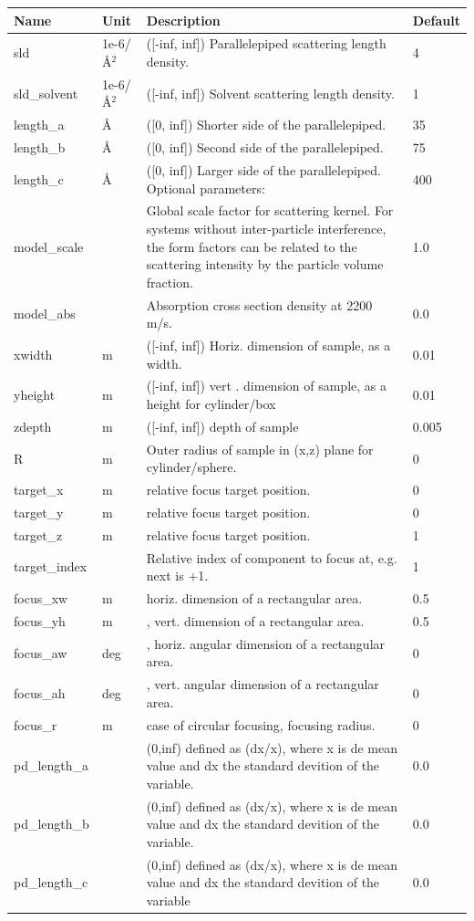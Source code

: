\begin{longtable}{p{}p{}p{}p{}}
\toprule
\textbf{Name} & \textbf{Unit} & \textbf{Description} & \textbf{Default} \\
\midrule
\endhead
sld & 1e-6/\AA{}$^{2}$ & ([-inf, inf]) Parallelepiped scattering length density. & 4 \\
sld\_solvent & 1e-6/\AA{}$^{2}$ & ([-inf, inf]) Solvent scattering length density. & 1 \\
length\_a & \AA{} & ([0, inf]) Shorter side of the parallelepiped. & 35 \\
length\_b & \AA{} & ([0, inf]) Second side of the parallelepiped. & 75 \\
length\_c & \AA{} & ([0, inf]) Larger side of the parallelepiped. Optional parameters: & 400 \\
model\_scale &   & Global scale factor for scattering kernel. For systems without inter-particle interference, the form factors can be related to the scattering intensity by the particle volume fraction. & 1.0 \\
model\_abs &   & Absorption cross section density at 2200 m/s. & 0.0 \\
xwidth & m & ([-inf, inf]) Horiz. dimension of sample, as a width. & 0.01 \\
yheight & m & ([-inf, inf]) vert . dimension of sample, as a height for cylinder/box & 0.01 \\
zdepth & m & ([-inf, inf]) depth of sample & 0.005 \\
R & m & Outer radius of sample in (x,z) plane for cylinder/sphere. & 0 \\
target\_x & m & relative focus target position. & 0 \\
target\_y & m & relative focus target position. & 0 \\
target\_z & m & relative focus target position. & 1 \\
target\_index &   & Relative index of component to focus at, e.g. next is +1. & 1 \\
focus\_xw & m & horiz. dimension of a rectangular area. & 0.5 \\
focus\_yh & m & , vert. dimension of a rectangular area. & 0.5 \\
focus\_aw & deg & , horiz. angular dimension of a rectangular area. & 0 \\
focus\_ah & deg & , vert. angular dimension of a rectangular area. & 0 \\
focus\_r & m & case of circular focusing, focusing radius. & 0 \\
pd\_length\_a &  & (0,inf) defined as (dx/x), where x is de mean value and dx the standard devition of the variable. & 0.0 \\
pd\_length\_b &  & (0,inf) defined as (dx/x), where x is de mean value and dx the standard devition of the variable. & 0.0 \\
pd\_length\_c &  & (0,inf) defined as (dx/x), where x is de mean value and dx the standard devition of the variable & 0.0 \\
\bottomrule
\end{longtable}

